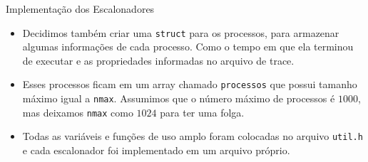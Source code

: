 \documentclass[10pt]{beamer}
\begin{document}
    \begin{frame}{Implementação dos Escalonadores}
        \begin{itemize}
            \justifying
            \item Decidimos também criar uma \texttt{struct} para os processos, para
        armazenar algumas informações de cada processo. Como o tempo em que ela terminou
        de executar e as propriedades informadas no arquivo de trace.

            \item Esses processos ficam em um array chamado \texttt{processos} que possui tamanho
        máximo igual a \texttt{nmax}. Assumimos que o número máximo de processos é
        $1000$, mas deixamos \texttt{nmax} como $1024$ para ter uma folga.

            \item Todas as variáveis e funções de uso amplo foram colocadas no arquivo
        \texttt{util.h} e cada escalonador foi implementado em um arquivo próprio.
        \end{itemize}
    \end{frame}
\end{document}
